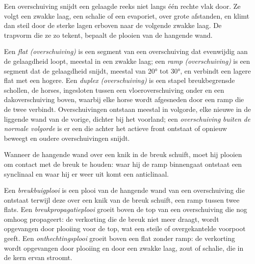 Een overschuiving snijdt een gelaagde reeks niet langs één rechte vlak door.
Ze volgt een zwakke laag, een schalie of een evaporiet, over grote afstanden, en
klimt dan steil door de sterke lagen erboven naar de volgende zwakke laag. De
trapvorm die ze zo tekent, bepaalt de plooien van de hangende wand.

\begin{definition}\label{def:b3:orogenic-wedges:thrust-geometry}
Een \emph{flat (overschuiving)} is een segment van een overschuiving dat
evenwijdig aan de gelaagdheid loopt, meestal in een zwakke laag; een \emph{ramp
(overschuiving)} is een segment dat de gelaagdheid snijdt,
meestal van \ang{20} tot \ang{30}, en verbindt een lagere flat met een hogere.
Een \emph{duplex (overschuiving)} is een stapel breukbegrensde
schollen, de horses, ingesloten tussen een vloeroverschuiving onder en een dakoverschuiving
boven, waarbij elke horse wordt afgesneden door een ramp die de twee verbindt. Overschuivingen ontstaan meestal
in volgorde, elke nieuwe in de liggende wand van de vorige, dichter bij het
voorland; een \emph{overschuiving buiten de normale volgorde} is
er een die achter het actieve front ontstaat of opnieuw beweegt en oudere overschuivingen snijdt.
\end{definition}

Wanneer de hangende wand over een knik in de breuk schuift, moet hij plooien om
contact met de breuk te houden: waar hij de ramp binnengaat ontstaat een synclinaal en
waar hij er weer uit komt een anticlinaal.

\begin{definition}\label{def:b3:orogenic-wedges:thrust-folds}
Een \emph{breukbuigplooi} is een plooi van de hangende wand
van een overschuiving die ontstaat terwijl deze over een knik van de breuk schuift, een ramp tussen
twee flats. Een \emph{breukpropagatieplooi}
groeit boven de top van een overschuiving die nog omhoog propageert: de
verkorting die de breuk niet meer draagt, wordt opgevangen door plooiing voor
de top, wat een steile of overgekantelde voorpoot geeft. Een
\emph{onthechtingsplooi} groeit boven een flat zonder ramp: de verkorting
wordt opgevangen door plooiing en door een zwakke laag, zout of schalie, die in
de kern ervan stroomt.
\end{definition}

